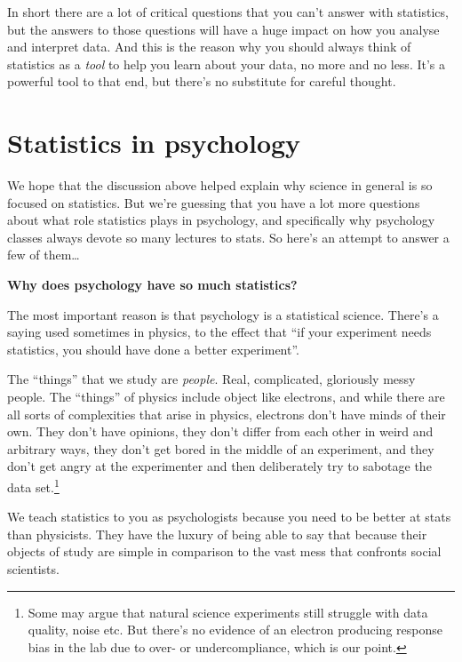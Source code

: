 \documentclass[
  11pt,
  a4paper,
  twoside,symmetric,openright]{book}
\theoremstyle{break}
\theoremstyle{break}
\begin{document}
In short there are a lot of critical questions that you can't answer with statistics, but the answers to those questions will have a huge impact on how you analyse and interpret data. And this is the reason why you should always think of statistics as a \emph{tool} to help you learn about your data, no more and no less. It's a powerful tool to that end, but there's no substitute for careful thought.

\hypertarget{statistics-in-psychology}{%
\section{Statistics in psychology}\label{statistics-in-psychology}}

We hope that the discussion above helped explain why science in general is so focused on statistics. But we're guessing that you have a lot more questions about what role statistics plays in psychology, and specifically why psychology classes always devote so many lectures to stats. So here's an attempt to answer a few of them\ldots{}

\textbf{Why does psychology have so much statistics?}

\nopagebreak[4]

The most important reason is that psychology is a statistical science. There's a saying used sometimes in physics, to the effect that ``if your experiment needs statistics, you should have done a better experiment''.

The ``things'' that we study are \emph{people}. Real, complicated, gloriously messy people. The ``things'' of physics include object like electrons, and while there are all sorts of complexities that arise in physics, electrons don't have minds of their own. They don't have opinions, they don't differ from each other in weird and arbitrary ways, they don't get bored in the middle of an experiment, and they don't get angry at the experimenter and then deliberately try to sabotage the data set.\footnote{Some may argue that natural science experiments still struggle with data quality, noise etc. But there's no evidence of an electron producing response bias in the lab due to over- or undercompliance, which is our point.}

We teach statistics to you as psychologists because you need to be better at stats than physicists. They have the luxury of being able to say that because their objects of study are simple in comparison to the vast mess that confronts social scientists.
\end{document}
